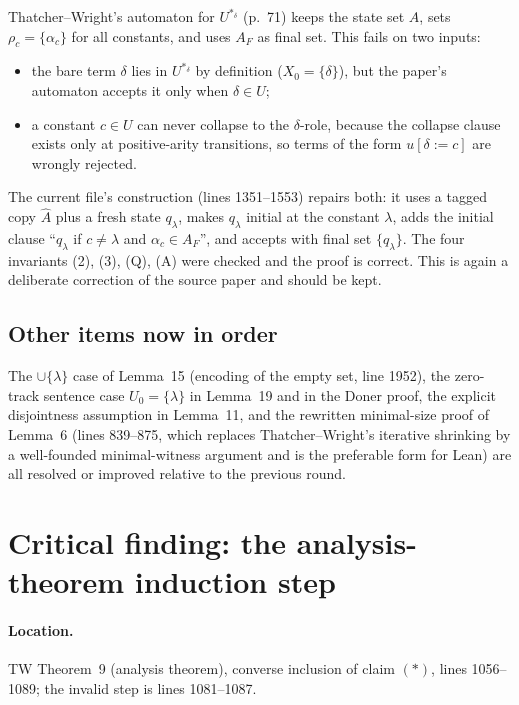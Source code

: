 \documentclass[11pt]{article}
\newcommand{\TW}{Thatcher--Wright}
\begin{document}
\TW{}'s automaton for \(U^{*_\delta}\) (p.~71) keeps the state set \(A\), sets
\(\rho_c=\{\alpha_c\}\) for all constants, and uses \(A_F\) as final set.  This
fails on two inputs:
\begin{itemize}[leftmargin=*]
  \item the bare term \(\delta\) lies in \(U^{*_\delta}\) by definition
    (\(X_0=\{\delta\}\)), but the paper's automaton accepts it only when
    \(\delta\in U\);
  \item a constant \(c\in U\) can never collapse to the \(\delta\)-role,
    because the collapse clause exists only at positive-arity transitions, so
    terms of the form \(u[\delta:=c]\) are wrongly rejected.
\end{itemize}
The current file's construction (lines 1351--1553) repairs both: it uses a
tagged copy \(\widehat A\) plus a fresh state \(q_\lambda\), makes
\(q_\lambda\) initial at the constant \(\lambda\), adds the initial clause
``\(q_\lambda\) if \(c\ne\lambda\) and \(\alpha_c\in A_F\)'', and accepts with
final set \(\{q_\lambda\}\).  The four invariants (2), (3), (Q), (A) were
checked and the proof is correct.  This is again a deliberate correction of the
source paper and should be kept.

\subsection{Other items now in order}

The \(\cup\{\lambda\}\) case of Lemma~15 (encoding of the empty set, line
1952), the zero-track sentence case \(U_0=\{\lambda\}\) in Lemma~19 and in the
Doner proof, the explicit disjointness assumption in Lemma~11, and the
rewritten minimal-size proof of Lemma~6 (lines 839--875, which replaces \TW{}'s
iterative shrinking by a well-founded minimal-witness argument and is the
preferable form for Lean) are all resolved or improved relative to the previous
round.

\section{Critical finding: the analysis-theorem induction step}
\label{sec:critical}

\paragraph{Location.} TW Theorem~9 (analysis theorem), converse inclusion of
claim \((*)\), lines 1056--1089; the invalid step is lines 1081--1087.
\end{document}

